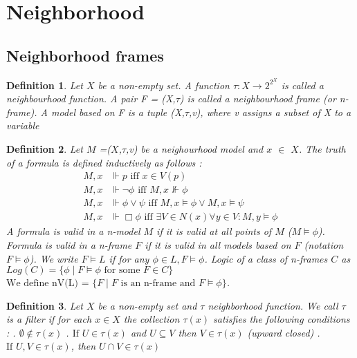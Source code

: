 \documentclass[12pt, a4paper]{scrartcl}
\newtheorem{definition}{Definition}[subsection]
\begin{document}
\clearpage
\section{Neighborhood}
\subsection{Neighborhood frames}

\begin{definition}
    Let $X$ be a non-empty set. A function  $\tau : X \rightarrow 2^{2^X}$ is called a neighbourhood function. A pair 
    F = (X,$\tau$) is called a neighbourhood frame (or n-frame). A model based on F is a tuple (X,$\tau$,v), where v assigns a subset of X to a variable
        
\end{definition}

\vspace{0.5cm}

\begin{definition}
    Let $M$ =($X$,$\tau$,v) be a neighourhood model and $x$ $\in$ $X$. The truth of a formula is defined inductively as follows :
    \begin{align*}
        M,x &\Vdash p \mbox{ iff } x \in V(p)\\
        M,x &\Vdash \neg \phi \mbox{ iff } M,x \nVdash \phi\\
        M,x &\Vdash \phi \lor \psi \mbox{ iff } M,x \vDash \phi \lor M,x \vDash \psi\\
        M,x &\Vdash \Box \phi \mbox{ iff } \exists V \in N(x) \forall y \in V : M,y \models \phi
    \end{align*}
    A formula is valid in a n-model $M$ if it is valid at all points of $M$ ($M \vDash \phi$). Formula is valid in a n-frame $F$ if it is valid in
    all models based on $F$ (notation $F \vDash \phi$). We write $F \vDash L$ if for any $\phi \in L, F \vDash \phi$. Logic of a class of n-frames $C$ as $Log(C) = \{\phi \mid F \vDash \phi \mbox{ for some } F \in C\}$
    $\mbox{We define nV(L) =  } \{ F \mid F \mbox{ is an n-frame and } F \models \phi \}$.
\end{definition}

\begin{definition}
    Let $X$ be a non-empty set and $\tau$ neighborhood function. We call $\tau$ is a filter if for each $x\in X$ the collection $\tau(x)$
    satisfies the following conditions : \newline {}. $\emptyset \notin \tau(x)$ . $\mbox{If }U \in \tau(x)$ and $U \subseteq V$ then $V \in \tau(x)$ (upward closed) . $\mbox{If }U, V \in \tau(x)$, then $U \cap V \in \tau(x)$
\end{definition}
\end{document}
